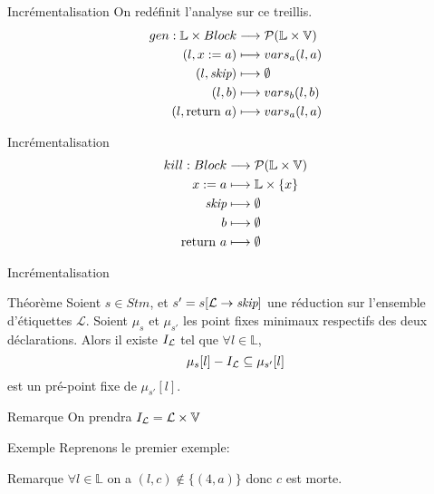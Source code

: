 \documentclass{beamer}
\begin{document}
\begin{frame}{Incrémentalisation}
	On redéfinit l'analyse sur ce treillis.
	\begin{align*}
		gen : \mathbb{L} \times Block &\longrightarrow \mathcal{P}(\mathbb{L} \times \mathbb{V})\\
		(l, {x}\space:=\space{a}) &\longmapsto vars_a(l, a)\\
		(l, \textit{skip}) &\longmapsto \emptyset\\
		(l, b) &\longmapsto vars_b(l, b)\\
		(l, \text{return }{a}) &\longmapsto vars_a(l, a)
	\end{align*}
\end{frame}

\begin{frame}{Incrémentalisation}
	\begin{align*}
		kill : Block &\longrightarrow \mathcal{P}(\mathbb{L} \times \mathbb{V})\\
		{x}\space:=\space{a} &\longmapsto \mathbb{L} \times \{x\}\\
		\textit{skip} &\longmapsto \emptyset\\
		b &\longmapsto \emptyset\\
		\text{return }{a} &\longmapsto \emptyset
	\end{align*}
\end{frame}

\begin{frame}{Incrémentalisation}
	\begin{block}{Théorème}
		Soient $s \in Stm$, et $s' = s[\mathcal{L} \rightarrow{ \textit{skip} }]$ une réduction sur
	l'ensemble d'étiquettes $\mathcal{L}$. Soient $\mu_s$ et $\mu_{s'}$ les point fixes minimaux respectifs
	des deux déclarations.
	Alors il existe $I_{\mathcal{L}}$ tel que $\forall l \in \mathbb{L}$,
	\[
		\mu_s[l] - I_{\mathcal{L}} \subseteq \mu_{s'}[l]
	\]
	est un pré-point fixe de $\mu_{s'}[l]$.
	\end{block}
	\begin{block}{Remarque}
		On prendra $I_{\mathcal{L}} = \mathcal{L}\times\mathbb{V}$
	\end{block}
\end{frame}

\begin{frame}{Exemple}
	Reprenons le premier exemple:
	\lst
	\begin{block}{Remarque}
		$\forall l \in \mathbb{L}$ on a $(l, c) \notin \{(4, a)\}$ donc $c$ est morte.
	\end{block}
\end{frame}
\end{document}
